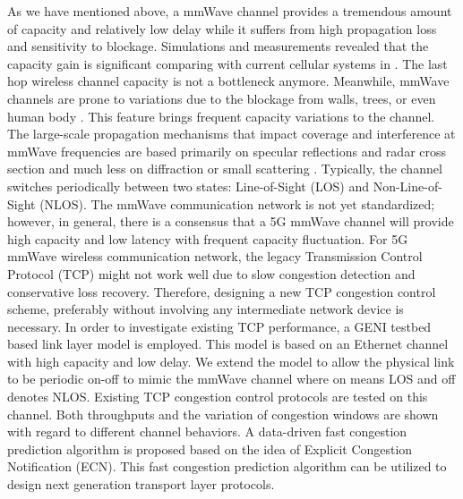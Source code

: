 \par As we have mentioned above, a mmWave channel provides a tremendous amount of capacity and relatively low delay while it suffers from high propagation loss and sensitivity to blockage. Simulations and measurements revealed that the capacity gain is significant comparing with current cellular systems in \cite{akdeniz2014millimeter,bai2015coverage}. The last hop wireless channel capacity is not a bottleneck anymore. Meanwhile, mmWave channels are prone to variations due to the blockage from walls, trees, or even human body \cite{lu2012modeling, zhao201328, alejos2008measurement}. This feature brings frequent capacity variations to the channel. The large-scale propagation mechanisms that impact coverage and interference at mmWave frequencies are based primarily on specular reflections and radar cross section and much less on diffraction or small scattering \cite{rappaport2014millimeter}. Typically, the channel switches periodically between two states: Line-of-Sight (LOS) and Non-Line-of-Sight (NLOS). The mmWave communication network is not yet standardized; however, in general, there is a consensus that a 5G mmWave channel will provide high capacity and low latency with frequent capacity fluctuation. For 5G mmWave wireless communication network, the legacy Transmission Control Protocol (TCP) might not work well due to slow congestion detection and conservative loss recovery. Therefore, designing a new TCP congestion control scheme, preferably without involving any intermediate network device is necessary. In order to investigate existing TCP performance, a GENI testbed based link layer model is employed. This model is based on an Ethernet channel with high capacity and low delay. We extend the model to allow the physical link to be periodic on-off to mimic the mmWave channel where on means LOS and off denotes NLOS. Existing TCP congestion control protocols are tested on this channel. Both throughputs and the variation of congestion windows are shown with regard to different channel behaviors. A data-driven fast congestion prediction algorithm is proposed based on the idea of Explicit Congestion Notification (ECN). This fast congestion prediction algorithm can be utilized to design next generation transport layer protocols.

